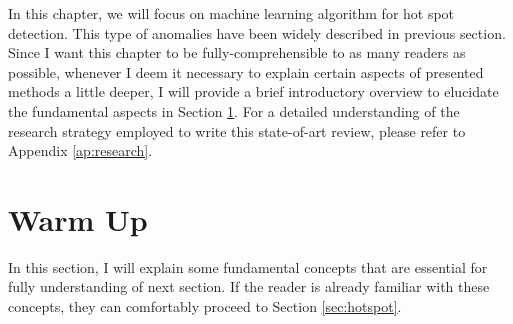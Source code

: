 In this chapter, we will focus on machine learning algorithm for hot spot detection. This type of anomalies have been widely described in previous section. Since I want this chapter to be fully-comprehensible to as many readers as possible, whenever I deem it necessary to explain certain aspects of presented methods a little deeper, I will provide a brief introductory overview to elucidate the fundamental aspects in Section \ref{sec:introperritardati}. For a detailed understanding of the research strategy employed to write this state-of-art review, please refer to Appendix \ref{ap:research}. 

\section{Warm Up}
\label{sec:introperritardati}
In this section, I will explain some fundamental concepts that are essential for fully understanding of next section. If the reader is already familiar with these concepts, they can comfortably proceed to Section \ref{sec:hotspot}. 

